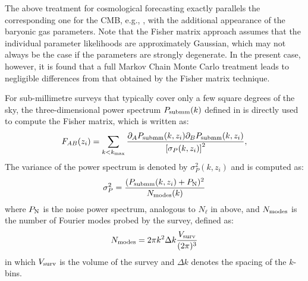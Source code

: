 The above treatment for cosmological forecasting  exactly parallels the corresponding one for the CMB, e.g., \cite{bond1997}, with the additional appearance of the baryonic gas parameters. Note that the Fisher matrix approach assumes that the individual parameter likelihoods are approximately Gaussian, which may not always be the case if the parameters are strongly degenerate. In the present case, however, it is found \cite{hparaa2019} that a full Markov Chain Monte Carlo treatment leads to negligible differences from that obtained by the Fisher matrix technique.

For sub-millimetre surveys that typically cover only a few square degrees of the sky, the three-dimensional power spectrum $P_{\rm submm}(k)$ defined in  is directly used to compute the Fisher matrix, which is written as:
\begin{equation}
F_{AB} (z_i) = \sum_{k < k_{\rm max}} \frac{\partial_A P_{\rm submm}(k, z_i)
\partial_B P_{\rm submm}(k,z_i)}{\left[\sigma_P(k,z_i)\right]^2},
\end{equation}
The variance of the power spectrum is denoted by $\sigma_P^2(k, z_i)$ and is computed as:
\begin{equation}
    \sigma_P^2 = \frac{(P_{\rm submm}(k, z_i) + P_{\rm N})^2}{{N_{\rm modes}(k)}}
    \label{varianceauto}
\end{equation}
where $P_{\rm N}$ is the noise power spectrum, analogous to $N_{\ell}$ in  above, and $N_{\rm modes}$ is the number of Fourier modes probed by the survey, defined as:
\begin{equation}
    N_{\rm modes} = 2 \pi k^2 \Delta k \frac{V_{\rm surv}}{(2 \pi)^3} 
\end{equation}
in which $V_{\rm surv}$ is the volume of the survey and $\Delta k$ denotes the spacing of the $k$-bins.

